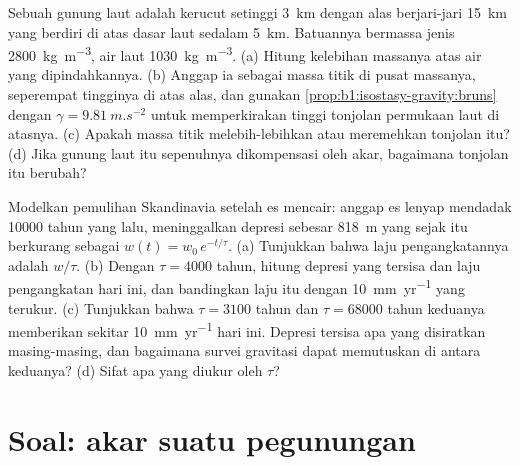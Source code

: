 \begin{exercise}[$\star\star\star$]\label{exo:b1:isostasy-gravity:11}
Sebuah gunung laut adalah kerucut setinggi \qty{3}{km} dengan alas berjari-jari \qty{15}{km} yang berdiri di atas dasar laut sedalam \qty{5}{km}. Batuannya bermassa jenis \qty{2800}{kg.m^{-3}}, air laut \qty{1030}{kg.m^{-3}}. (a) Hitung kelebihan massanya atas air yang dipindahkannya. (b) Anggap ia sebagai massa titik di pusat massanya, seperempat tingginya di atas alas, dan gunakan
\cref{prop:b1:isostasy-gravity:bruns} dengan $\gamma = \qty{9.81}{m.s^{-2}}$ untuk memperkirakan tinggi tonjolan permukaan laut di atasnya. (c) Apakah massa titik melebih-lebihkan atau meremehkan tonjolan itu? (d) Jika gunung laut itu sepenuhnya dikompensasi oleh akar, bagaimana tonjolan itu berubah?
\end{exercise}

\begin{exercise}[$\star\star\star$]\label{exo:b1:isostasy-gravity:12}
Modelkan pemulihan Skandinavia setelah es mencair: anggap es lenyap mendadak \num{10000} tahun yang lalu, meninggalkan depresi sebesar \qty{818}{m} yang sejak itu berkurang sebagai $w(t) = w_0\,e^{-t/\tau}$. (a) Tunjukkan bahwa laju pengangkatannya adalah
$w/\tau$. (b) Dengan $\tau = \num{4000}$ tahun, hitung depresi yang tersisa dan laju pengangkatan hari ini, dan bandingkan laju itu dengan \qty{10}{mm.yr^{-1}} yang terukur. (c) Tunjukkan bahwa $\tau = \num{3100}$ tahun dan $\tau = \num{68000}$ tahun keduanya memberikan sekitar \qty{10}{mm.yr^{-1}} hari ini. Depresi tersisa apa yang disiratkan masing-masing, dan bagaimana survei gravitasi dapat memutuskan di antara keduanya? (d) Sifat  apa yang diukur oleh $\tau$?
\end{exercise}

\section{Soal: akar suatu pegunungan}

